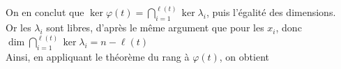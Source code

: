 \documentclass{article}
\DeclareMathOperator{\rg}{\mathrm{rg}}
\def \r {{\ell(t)}}
\begin{document}
\begin{enumerate}[1., start=1]
        \par \setlength{\leftskip}{0cm}
        On en conclut que $\displaystyle\ker \varphi(t) = \bigcap_{i=1}^\r\ker\lambda_i$, puis l'égalité des dimensions.\\
        Or les $\lambda_i$ sont libres, d'après le même argument que pour les $x_i$, donc $\displaystyle \dim\bigcap_{i=1}^\r\ker\lambda_i = n-\r$\\
        Ainsi, en appliquant le théorème du rang à $\varphi(t)$, on obtient
        \boxed{\rg\varphi(t) = \r}

            
\end{enumerate}
\end{document}
